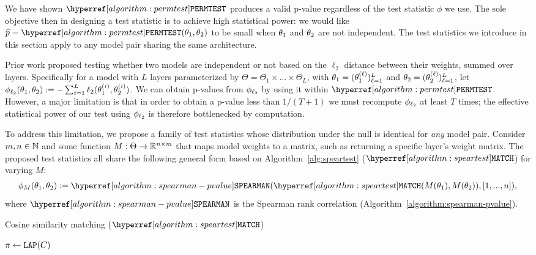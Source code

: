 We have shown $\permtest$ produces a valid p-value regardless of the test statistic $\phi$ we use.
The sole objective then in designing a test statistic is to achieve high statistical power: we would like $\est{p} = \permtest(\firstparam,\secondparam)$ to be small when $\theta_1$ and $\theta_2$ are not independent.
The test statistics we introduce in this section apply to any model pair sharing the same architecture. 

Prior work \citep{xu2024instructionalfingerprintinglargelanguage} proposed testing whether two models are independent or not based on the $\ell_2$ distance between their weights, summed over layers. Specifically
for a model with $L$ layers parameterized by $\Theta = \Theta_1 \times ... \times \Theta_L$, with $\theta_1 = (\theta_1^{(\ell)})_{\ell=1}^L$ and $\theta_2 = (\theta_2^{(\ell)})_{\ell=1}^L$,
let $\phi_{\ell_2}(\theta_1,\theta_2) := - \sum_{i=1}^L \ell_2(\theta_1^{(i)},\theta_2^{(i)})$.
We can obtain p-values from $\phi_{\ell_2}$ by using it within $\permtest$.
However, a major limitation is that in order to obtain a p-value less than $1/(T+1)$ we must recompute $\phi_{\ell_2}$ at least $T$ times; the effective statistical power of our test using $\phi_{\ell_2}$ is therefore bottlenecked by computation.

To address this limitation, we propose a family of test statistics whose distribution under the null is identical for \textit{any} model pair. Consider 
$m, n \in \mathbb{N}$ and some function $M : \Theta \to \mathbb{R}^{n \times m}$ that maps model weights to a matrix, such as returning a specific layer's weight matrix.
The proposed test statistics all share the following general form based on Algorithm~\ref{alg:speartest} ($\speartest$) for varying $M$:
\begin{align}\label{eqn:phi-m}
    \phi_M(\firstparam,\secondparam) \defeq \spearman(\speartest(M(\firstparam),M(\secondparam)),[1,...,n]),
\end{align}
where $\spearman$ is the Spearman rank correlation (Algorithm~\ref{algorithm:spearman-pvalue}).

\begin{algorithm}[h]\label{algorithm:speartest}
    \DontPrintSemicolon
    \caption{Cosine similarity matching ($\speartest$)}
    \label{alg:speartest}
    $\pi \gets \mathtt{LAP}(C)$\;
    \Return{$\pi$}
\end{algorithm}

